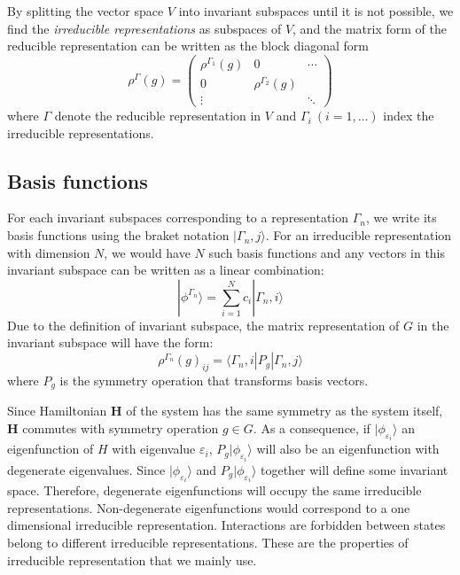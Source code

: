 \documentclass{article}
\begin{document}
By splitting the vector space $V$ into invariant subspaces until it is not possible, we find the 
\emph{irreducible representations} as subspaces of $V$, and the matrix form 
of the reducible representation can be written as the block diagonal form
\begin{equation}
    \rho^{\Gamma}(g) = \left(  
        \begin{matrix}
            \rho^{\Gamma_1} (g) & 0 & \cdots\\
            0 & \rho^{\Gamma_2} (g) & \\
            \vdots &  & \ddots
        \end{matrix}
    \right)
\end{equation}
where $\Gamma$ denote the reducible representation in $V$ and $\Gamma_i\ (i = 1, \dots)$ index 
the irreducible representations.

\subsection{Basis functions}
For each invariant subspaces corresponding to a representation $\Gamma_n$, we write its basis 
functions using the braket notation $|\Gamma_n,j\rangle$. For an irreducible representation with 
dimension $N$, we would have $N$ such basis functions and any vectors in this invariant subspace 
can be written as a linear combination:
\begin{equation}
    |\phi^{\Gamma_n}\rangle = \sum_{i = 1}^N c_i |\Gamma_n,i\rangle
\end{equation} 
Due to the definition of invariant subspace, the matrix representation of $G$ in the invariant 
subspace will have the form:
\begin{equation}
    \rho^{\Gamma_n}(g)_{ij} = \langle \Gamma_n,i | P_g | \Gamma_n,j \rangle
\end{equation}
where $P_g$ is the symmetry operation that transforms basis vectors.

Since Hamiltonian $\mathbf{H}$ of the system has the same symmetry as the system itself, $\mathbf{H}$
commutes with symmetry operation $g \in G$. 
As a consequence, if $|\phi_{\varepsilon_i}\rangle$ an eigenfunction of $H$
with eigenvalue $\varepsilon_i$, $P_g|\phi_{\varepsilon_i}\rangle$ will also be an eigenfunction 
with degenerate eigenvalues. Since $|\phi_{\varepsilon_i}\rangle$ and $P_g|\phi_{\varepsilon_i}\rangle$
together will define some invariant space. Therefore, degenerate eigenfunctions will occupy the same 
irreducible representations. Non-degenerate eigenfunctions would correspond to a one dimensional irreducible 
representation. Interactions are forbidden between 
states belong to different irreducible representations. These are the properties
of irreducible representation that we mainly use\cite{dresselhaus_group_2008}.
\end{document}
